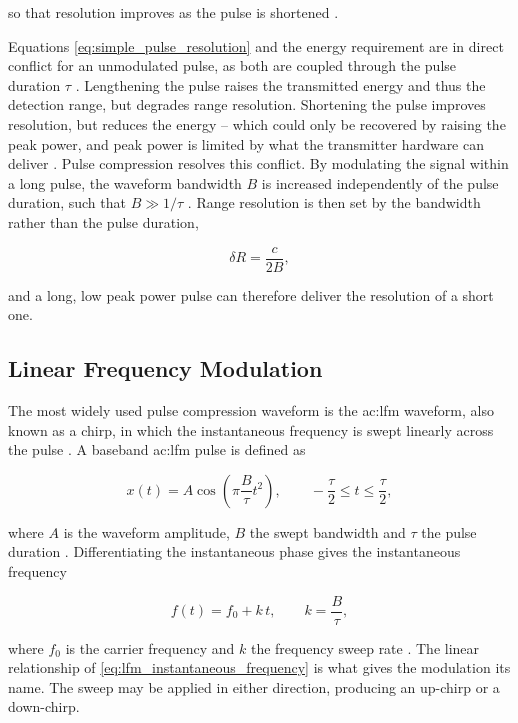 so that resolution improves as the pulse is shortened \cite{pomr}.

Equations \eqref{eq:simple_pulse_resolution} and the energy requirement are in direct conflict for an unmodulated pulse, as both are coupled through the pulse duration $\tau$ \cite{pomr}. Lengthening the pulse raises the transmitted energy and thus the detection range, but degrades range resolution. Shortening the pulse improves resolution, but reduces the energy -- which could only be recovered by raising the peak power, and peak power is limited by what the transmitter hardware can deliver \cite{marthinmon}. Pulse compression resolves this conflict. By modulating the signal within a long pulse, the waveform bandwidth $B$ is increased independently of the pulse duration, such that $B \gg 1/\tau$ \cite{pomr}. Range resolution is then set by the bandwidth rather than the pulse duration,

\begin{equation}
  \delta R = \frac{c}{2B},
  \label{eq:range_resolution}
\end{equation}

and a long, low peak power pulse can therefore deliver the resolution of a short one.

\subsection{Linear Frequency Modulation}\label{sec:linear_frequency_modulation}

The most widely used pulse compression waveform is the \gls{ac:lfm} waveform, also known as a chirp, in which the instantaneous frequency is swept linearly across the pulse \cite{pomr}. A baseband \gls{ac:lfm} pulse is defined as

\begin{equation}
  x(t) = A\cos\left(\pi\frac{B}{\tau}t^2\right),
  \qquad -\frac{\tau}{2} \leq t \leq \frac{\tau}{2},
  \label{eq:lfm_waveform}
\end{equation}

where $A$ is the waveform amplitude, $B$ the swept bandwidth and $\tau$ the pulse duration \cite{pomr}. Differentiating the instantaneous phase gives the instantaneous frequency

\begin{equation}
  f(t) = f_0 + k\,t, \qquad k = \frac{B}{\tau},
  \label{eq:lfm_instantaneous_frequency}
\end{equation}

where $f_0$ is the carrier frequency and $k$ the frequency sweep rate \cite{marthinmon}. The linear relationship of \eqref{eq:lfm_instantaneous_frequency} is what gives the modulation its name. The sweep may be applied in either direction, producing an up-chirp or a down-chirp.

